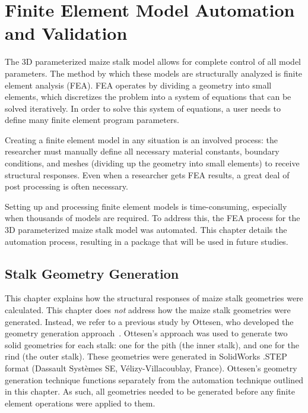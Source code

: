 \chapter{Finite Element Model Automation and Validation }
\label{ch:ch2}

The 3D parameterized maize stalk model allows for complete control of all model parameters. The method by which these models are structurally analyzed is finite element analysis (FEA). FEA operates by dividing a geometry into small elements, which discretizes the problem into a system of equations that can be solved iteratively. In order to solve this system of equations, a user needs to define many finite element program parameters.

Creating a finite element model in any situation is an involved process: the researcher must manually define all necessary material constants, boundary conditions, and meshes (dividing up the geometry into small elements) to receive structural responses. Even when a researcher gets FEA results, a great deal of post processing is often necessary.

Setting up and processing finite element models is time-consuming, especially when thousands of models are required. To address this, the FEA process for the 3D parameterized maize stalk model was automated. This chapter details the automation process, resulting in a package that will be used in future studies.

\section{Stalk Geometry Generation}
\label{sec:stalk_geometry_generation}
This chapter explains how the structural responses of maize stalk geometries were calculated. This chapter does \textit{not} address how the maize stalk geometries were generated. Instead, we refer to a previous study by Ottesen, who developed the geometry generation approach~. Ottesen’s approach was used to generate two solid geometries for each stalk: one for the pith (the inner stalk), and one for the rind (the outer stalk). These geometries were generated in SolidWorks .STEP format (Dassault Systèmes SE, Vélizy-Villacoublay, France). Ottesen’s geometry generation technique functions separately from the automation technique outlined in this chapter. As such, all geometries needed to be generated before any finite element operations were applied to them.
\newline
\newline

